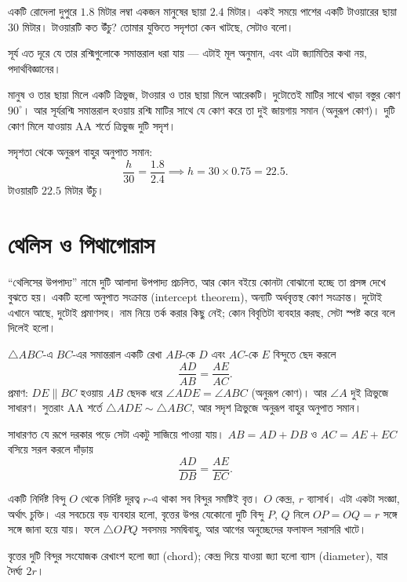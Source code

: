 \documentclass[11pt]{article}
\begin{document}
 একটি রোদেলা দুপুরে $1.8$ মিটার লম্বা একজন মানুষের ছায়া $2.4$ মিটার।
একই সময়ে পাশের একটি টাওয়ারের ছায়া $30$ মিটার। টাওয়ারটি কত উঁচু? তোমার যুক্তিতে
সদৃশতা কেন খাটছে, সেটাও বলো।

\begin{sol}
সূর্য এত দূরে যে তার রশ্মিগুলোকে সমান্তরাল ধরা যায় --- এটাই মূল অনুমান, এবং
এটা জ্যামিতির কথা নয়, পদার্থবিজ্ঞানের।

মানুষ ও তার ছায়া মিলে একটি ত্রিভুজ, টাওয়ার ও তার ছায়া মিলে আরেকটি। দুটোতেই
মাটির সাথে খাড়া বস্তুর কোণ $90^\circ$। আর সূর্যরশ্মি সমান্তরাল হওয়ায় রশ্মি
মাটির সাথে যে কোণ করে তা দুই জায়গায় সমান (অনুরূপ কোণ)। দুটি কোণ মিলে যাওয়ায়
AA শর্তে ত্রিভুজ দুটি সদৃশ।

সদৃশতা থেকে অনুরূপ বাহুর অনুপাত সমান:
\[
  \frac{h}{30} = \frac{1.8}{2.4} \implies h = 30 \times 0.75 = 22.5 .
\]
টাওয়ারটি $22.5$ মিটার উঁচু।
\end{sol}

\section{থেলিস ও পিথাগোরাস}

\begin{remark}
``থেলিসের উপপাদ্য'' নামে দুটি আলাদা উপপাদ্য প্রচলিত, আর কোন বইয়ে কোনটা বোঝানো
হচ্ছে তা প্রসঙ্গ দেখে বুঝতে হয়। একটি হলো অনুপাত সংক্রান্ত (intercept theorem),
অন্যটি অর্ধবৃত্তস্থ কোণ সংক্রান্ত। দুটোই এখানে আছে, দুটোই প্রমাণসহ। নাম নিয়ে
তর্ক করার কিছু নেই; কোন বিবৃতিটা ব্যবহার করছ, সেটা স্পষ্ট করে বলে দিলেই হলো।
\end{remark}

\begin{idea}[থেলিসের অনুপাত উপপাদ্য]
$\triangle ABC$-এ $BC$-এর সমান্তরাল একটি রেখা $AB$-কে $D$ এবং $AC$-কে $E$
বিন্দুতে ছেদ করলে
\[
  \frac{AD}{AB} = \frac{AE}{AC} .
\]
প্রমাণ: $DE \parallel BC$ হওয়ায় $AB$ ছেদক ধরে $\angle ADE = \angle ABC$
(অনুরূপ কোণ)। আর $\angle A$ দুই ত্রিভুজে সাধারণ। সুতরাং AA শর্তে
$\triangle ADE \sim \triangle ABC$, আর সদৃশ ত্রিভুজে অনুরূপ বাহুর অনুপাত সমান।

সাধারণত যে রূপে দরকার পড়ে সেটা একটু সাজিয়ে পাওয়া যায়। $AB = AD + DB$ ও
$AC = AE + EC$ বসিয়ে সরল করলে দাঁড়ায়
\[
  \frac{AD}{DB} = \frac{AE}{EC} .
\]
\end{idea}

\begin{idea}[বৃত্তের প্রাথমিক কথা]
একটি নির্দিষ্ট বিন্দু $O$ থেকে নির্দিষ্ট দূরত্ব $r$-এ থাকা সব বিন্দুর সমষ্টিই
বৃত্ত। $O$ কেন্দ্র, $r$ ব্যাসার্ধ। এটা একটা সংজ্ঞা, অর্থাৎ চুক্তি। এর
সবচেয়ে বড় ব্যবহার হলো, বৃত্তের উপর যেকোনো দুটি বিন্দু $P$, $Q$ নিলে
$OP = OQ = r$ সঙ্গে সঙ্গে জানা হয়ে যায়। ফলে $\triangle OPQ$ সবসময় সমদ্বিবাহু,
আর আগের অনুচ্ছেদের ফলাফল সরাসরি খাটে।

বৃত্তের দুটি বিন্দুর সংযোজক রেখাংশ হলো জ্যা (chord); কেন্দ্র দিয়ে যাওয়া জ্যা
হলো ব্যাস (diameter), যার দৈর্ঘ্য $2r$।
\end{idea}
\end{document}
